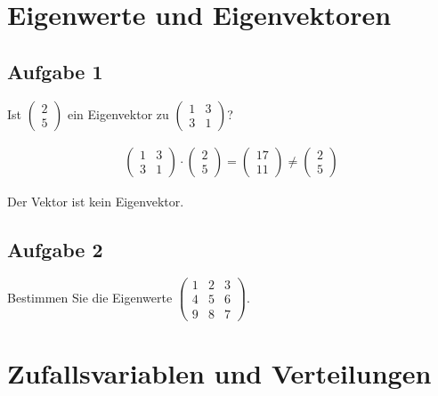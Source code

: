 \section{Eigenwerte und Eigenvektoren}

\subsection{Aufgabe 1}

Ist $\begin{pmatrix}
        2 \\5
    \end{pmatrix}$ ein Eigenvektor zu $\begin{pmatrix}
        1 & 3 \\ 3 & 1
    \end{pmatrix}$?

\begin{align*}
    \begin{pmatrix}
        1 & 3 \\ 3 & 1
    \end{pmatrix} \cdot \begin{pmatrix}
                            2 \\ 5
                        \end{pmatrix} = \begin{pmatrix}
                                            17 \\ 11
                                        \end{pmatrix} \neq \begin{pmatrix}
                                                               2 \\ 5
                                                           \end{pmatrix}
\end{align*}

Der Vektor ist kein Eigenvektor.

\subsection{Aufgabe 2}

Bestimmen Sie die Eigenwerte $\begin{pmatrix}
        1 & 2 & 3 \\
        4 & 5 & 6 \\
        9 & 8 & 7
    \end{pmatrix}$.

\section{Zufallsvariablen und Verteilungen}


